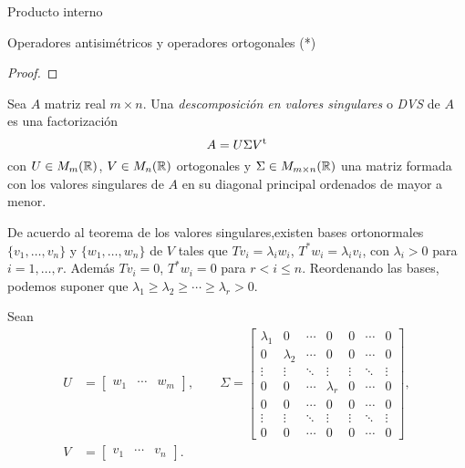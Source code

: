 \begin{chapter}{Producto interno}
\begin{section}{Operadores antisim\'etricos y operadores ortogonales (*)}
\begin{proof}
        \end{proof}
        
        \begin{definicion}
            Sea $A$ matriz real $m \times n$. Una \textit{descomposición en valores singulares} o \textit{DVS} de $A$ es una factorización $$A = U \Sigma V^{{\operatorname{t}}}$$ con $U \in M_{m}(\mathbb R)$, $V \in M_{n}(\mathbb R)$ ortogonales y $\Sigma \in M_{m \times n}(\mathbb R)$ una matriz formada con los valores singulares de $A$ en su diagonal principal ordenados de mayor a menor.
        \end{definicion}
        
        
        De acuerdo al teorema de los valores singulares,existen bases ortonormales $\{v_1,\ldots,v_n\}$ y $\{w_1,\ldots,w_n\}$  de $V$ tales que $Tv_i = \lambda_i w_i$,  $T^*w_i = \lambda_i v_i$, con $\lambda_i >0$ para $i=1,\ldots,r$. Además $Tv_i = 0$,  $T^*w_i = 0$ para $r < i \le n$. Reordenando las bases, podemos suponer que $\lambda_1 \ge \lambda_{2} \ge \cdots \ge \lambda_{r}>0$. 
        
        Sean
        \begin{align*}
        U &= \begin{bmatrix}
        w_1 & \cdots &  w_m
        \end{bmatrix},\qquad 
        \Sigma = \begin{bmatrix}
        \lambda_{1} & 0 & \cdots & 0 & 0 & \cdots & 0 \\ 
        0 & \lambda_{2} & \cdots & 0 & 0 & \cdots & 0 \\ 
        \vdots & \vdots & \ddots & \vdots & \vdots & \ddots & \vdots \\ 
        0 & 0 & \cdots & \lambda_{r} & 0 & \cdots & 0 \\  
        0 & 0 & \cdots & 0 & 0 & \cdots & 0 \\ 
        \vdots & \vdots & \ddots & \vdots & \vdots & \ddots & \vdots \\ 
        0 & 0 & \cdots & 0 & 0 & \cdots & 0 
        \end{bmatrix},\\
        V &= \begin{bmatrix}
        v_1 & \cdots & v_n
        \end{bmatrix}. 
        \end{align*}
        
        
        
        
        

\end{section}
\end{chapter}
